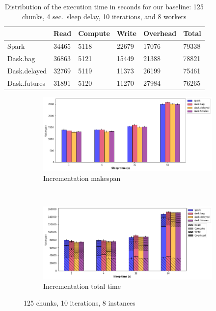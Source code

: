 \documentclass[conference]{IEEEtran}
\begin{document}
\begin{table}[!t]
    \renewcommand{\arraystretch}{1.3}
    \caption{Distribution of the execution time in seconds for our baseline: 125
    chunks, 4 sec.\ sleep delay, 10 iterations, and 8 workers}\label{tb:inc-sleep}
    \centering
    \begin{tabular*}{\columnwidth}{llllll}
    \hline
                 & Read  & Compute & Write & Overhead & Total \\ \hline
    Spark        & 34465 & 5118    & 22679 & 17076    & 79338 \\
    Dask.bag     & 36863 & 5121    & 15449 & 21388    & 78821 \\
    Dask.delayed & 32769 & 5119    & 11373 & 26199    & 75461 \\
    Dask.futures & 31891 & 5120    & 11270 & 27984    & 76265 \\ \hline
    \end{tabular*}
 \end{table}

\begin{figure}[!t]
    \centering
    \begin{subfigure}[b]{\columnwidth}
        \includegraphics[clip,width=\columnwidth]{images/inc_sleep.png}%
        \caption{Incrementation makespan}\label{fig:inc_ms_chunk}
    \end{subfigure}
    \\
    \begin{subfigure}[b]{\columnwidth}
        \includegraphics[clip,width=\columnwidth]{images/inc_idle_sleep.png}%
        \caption{Incrementation total time}\label{fig:inc_tt_chunk}
    \end{subfigure}
    \caption{125 chunks, 10 iterations, 8 instances}\label{fig:inc_sleep}
\end{figure}
\end{document}
